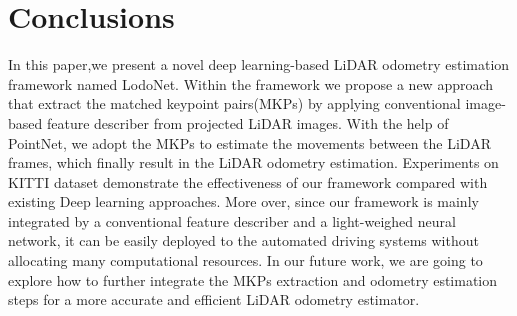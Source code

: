\documentclass[sigconf]{acmart}
\def\lodo{LodoNet}
\begin{document}
\section{Conclusions}
In this paper,we present a novel deep learning-based LiDAR odometry estimation framework named LodoNet. Within the framework we propose a new approach that extract the matched keypoint pairs(MKPs) by applying conventional image-based feature describer from projected LiDAR images. With the help of PointNet, we adopt the MKPs to estimate the movements between the LiDAR frames, which finally result in the LiDAR odometry estimation. Experiments on KITTI dataset demonstrate the effectiveness of our framework compared with existing Deep learning approaches. More over, since our framework is mainly integrated by a conventional feature describer and a light-weighed neural network, it can be easily deployed to the automated driving systems without allocating many computational resources. In our future work, we are going to explore how to further integrate the MKPs extraction and odometry estimation steps for a more accurate and efficient LiDAR odometry estimator.


\newpage



\end{document}
